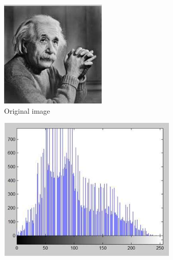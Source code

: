         \begin{figure}[h]
                \centering
                \begin{subfigure}[b]{0.3\textwidth}
                        \centering
                        \includegraphics[width=\textwidth]{chapiter1/figures/equa-processed-hist.png}
                        \caption{Original image}
                \end{subfigure}
                \hfill
                \begin{subfigure}[b]{0.5\textwidth}
                        \centering
                        \includegraphics[width=\textwidth]{chapiter1/figures/equa-original-image.png}

\end{subfigure}
\end{figure}
